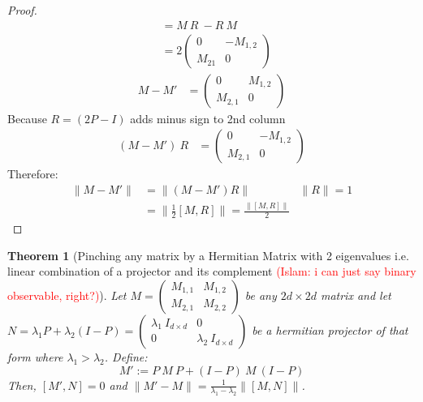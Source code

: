 \documentclass[12pt]{article}
\theoremstyle{plain}
\newtheorem{theorem}{Theorem}[section]
\newcommand{\IslamNote}[1]{\textcolor{red}{(Islam: #1)}}
\newcommand{\IslamNote}[1]{}
\begin{document}
\begin{proof}
    \begin{align*}
        [M, R] &= M\ R\ - R\ M\\
        &= 2 \begin{pmatrix}
            0 & -M_{1,2}\\
            M_{21} & 0
        \end{pmatrix}
    \end{align*}
    \begin{align*}
        M - M' &= \begin{pmatrix}
            0 & M_{1,2}\\
            M_{2,1} & 0
        \end{pmatrix}
    \end{align*}
Because $R = \left(2P - I\right)$ adds minus sign to 2nd column
    \begin{align*}
        \left(M - M'\right)\ R &=\begin{pmatrix}
            0 & -M_{1,2}\\
            M_{2,1} & 0
        \end{pmatrix}
    \end{align*}
Therefore:
\begin{align*}
\|M - M' \| &= \|(M - M') R \| & \|R\| = 1\\
&= \| \frac{1}{2} [M, R] \| = \frac{\|[M, R]\|}{2}
\end{align*}
\end{proof}

\begin{theorem}[Pinching any matrix by a Hermitian Matrix with 2 eigenvalues i.e. linear combination of a projector and its complement \IslamNote{i can just say binary observable, right?}]
    Let $M = \begin{pmatrix}
        M_{1,1} & M_{1,2}\\
        M_{2,1} & M_{2,2}
    \end{pmatrix}$ be any $2d \times 2d$ matrix and let $N = \lambda_1 P + \lambda_2 (I - P) = \begin{pmatrix}
        \lambda_1\: I_{d \times d} & 0\\ 0 & \lambda_2\: I_{d \times d}
    \end{pmatrix}$ be a hermitian projector of that form where $\lambda_1 > \lambda_2$. Define:
    \begin{equation}
        M' := P\ M\ P + (I - P)\ M\ (I - P)
    \end{equation}
    Then, $[M', N] = 0$ and $\|M' - M \| = \frac{1}{\lambda_1 - \lambda_2} \|[M, N]\|$.
\end{theorem}
\end{document}

